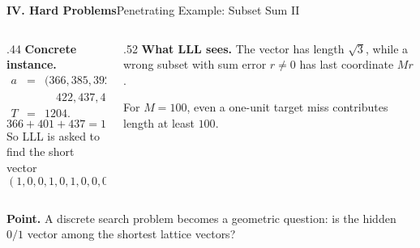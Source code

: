 \begin{frame}{\textbf{IV. Hard Problems}}{Penetrating Example: Subset Sum II}
\small
\begin{columns}[T,onlytextwidth]
\begin{column}{.44\textwidth}
\textbf{Concrete instance.}
\[
\begin{array}{rcl}
a&=&(366,385,392,401,\\
 &&\quad 422,437,450,463),\\
T&=&1204.
\end{array}
\]
\[
  366+401+437=1204.
\]
So LLL is asked to find the short vector
\[
  (1,0,0,1,0,1,0,0,0).
\]
\end{column}
\begin{column}{.52\textwidth}
\textbf{What LLL sees.}\; The vector has length $\sqrt3$, while a wrong subset with sum error $r\ne0$ has last coordinate $Mr$.

\vspace{.4em}
For $M=100$, even a one-unit target miss contributes length at least $100$.
\end{column}
\end{columns}
\begin{center}
\end{center}
\textbf{Point.}\; A discrete search problem becomes a geometric question: is the hidden $0/1$ vector among the shortest lattice vectors?
\end{frame}

